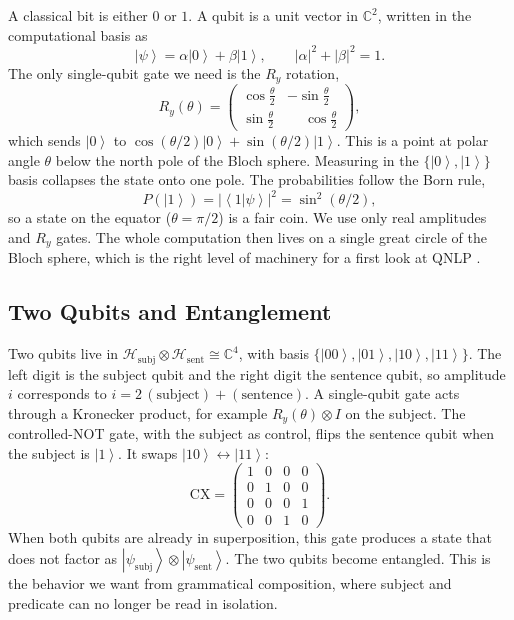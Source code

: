 \documentclass{article}
\newcommand{\ket}[1]{\left|#1\right\rangle}
\newcommand{\braket}[1]{\left\langle#1\right\rangle}
\begin{document}
A classical bit is either $0$ or $1$. A qubit is a unit vector in $\mathbb{C}^2$,
written in the computational basis as
\begin{equation}
  \ket{\psi} = \alpha\ket{0} + \beta\ket{1}, \qquad |\alpha|^2 + |\beta|^2 = 1.
\end{equation}
The only single-qubit gate we need is the $R_y$ rotation,
\begin{equation}
  R_y(\theta) =
  \begin{pmatrix} \cos\tfrac{\theta}{2} & -\sin\tfrac{\theta}{2} \\[2pt]
                  \sin\tfrac{\theta}{2} & \phantom{-}\cos\tfrac{\theta}{2} \end{pmatrix},
  \label{eq:ry}
\end{equation}
which sends $\ket{0}$ to $\cos(\theta/2)\ket{0} + \sin(\theta/2)\ket{1}$. This is
a point at polar angle $\theta$ below the north pole of the Bloch sphere.
Measuring in the $\{\ket{0},\ket{1}\}$ basis collapses the state onto one pole.
The probabilities follow the Born rule,
\begin{equation}
  P(\ket{1}) = |\!\braket{1|\psi}\!|^2 = \sin^2(\theta/2),
  \label{eq:born}
\end{equation}
so a state on the equator ($\theta = \pi/2$) is a fair coin. We use only real
amplitudes and $R_y$ gates. The whole computation then lives on a single great
circle of the Bloch sphere, which is the right level of machinery for a first
look at QNLP \citep{nielsen2010quantum}.

\subsection{Two Qubits and Entanglement}

Two qubits live in
$\mathcal{H}_\mathrm{subj} \otimes \mathcal{H}_\mathrm{sent} \cong \mathbb{C}^4$,
with basis $\{\ket{00},\ket{01},\ket{10},\ket{11}\}$. The left digit is the
subject qubit and the right digit the sentence qubit, so amplitude $i$
corresponds to $i = 2\,(\text{subject}) + (\text{sentence})$. A single-qubit gate
acts through a Kronecker product, for example $R_y(\theta)\otimes I$ on the
subject. The controlled-NOT gate, with the subject as control, flips the sentence
qubit when the subject is $\ket{1}$. It swaps $\ket{10}\leftrightarrow\ket{11}$:
\begin{equation}
  \mathrm{CX} =
  \begin{pmatrix}
    1&0&0&0\\ 0&1&0&0\\ 0&0&0&1\\ 0&0&1&0
  \end{pmatrix}.
  \label{eq:cx}
\end{equation}
When both qubits are already in superposition, this gate produces a state that
does not factor as $\ket{\psi_\mathrm{subj}}\otimes\ket{\psi_\mathrm{sent}}$. The
two qubits become entangled. This is the behavior we want from grammatical
composition, where subject and predicate can no longer be read in isolation.
\end{document}
